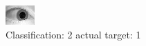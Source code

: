 \begin{figure}[h!]
\begin{center}
\includegraphics[width=0.60\columnwidth]{figures/ID1596_class_2_target_1.png}
\end{center}
\caption{ Classification: 2 actual target: 1}
\label{fig:ID1596_class_2_target_1}
\end{figure}
